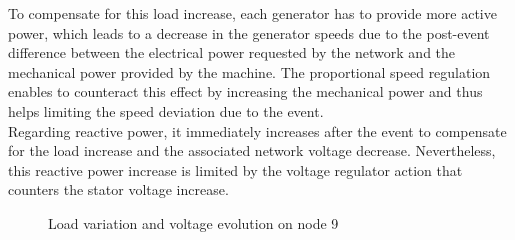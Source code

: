 \documentclass[a4paper, 12pt]{report}
\begin{document}
To compensate for this load increase, each generator has to provide more active power, which leads to a decrease in the generator speeds due to the post-event difference between the electrical power requested by the network and the mechanical power provided by the machine. The proportional speed regulation enables to counteract this effect by increasing the mechanical power and thus helps limiting the speed deviation due to the event. \\

Regarding reactive power, it immediately increases after the event to compensate for the load increase and the associated network voltage decrease. Nevertheless, this reactive power increase is limited by the voltage regulator action that counters the stator voltage increase.

\begin{figure}[H]
\caption{Load variation and voltage evolution on node 9}
\end{figure}
\end{document}

